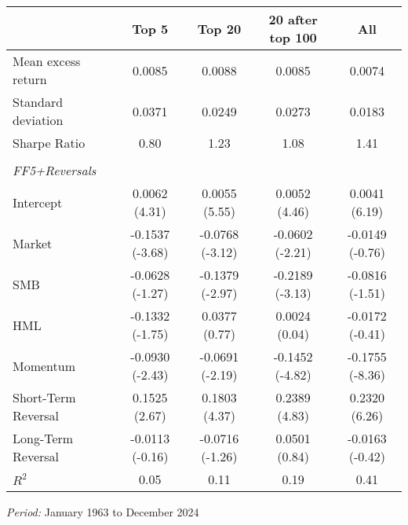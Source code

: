 \begin{table}[H]
\centering
\label{tab:systematic_risk}
\footnotesize
\begin{tabular}{lcccc}
\toprule
 & Top 5 & Top 20 & 20 after top 100 & All \\
\midrule
Mean excess return & 0.0085 & 0.0088 & 0.0085 & 0.0074 \\
Standard deviation & 0.0371 & 0.0249 & 0.0273 & 0.0183 \\
Sharpe Ratio & 0.80 & 1.23 & 1.08 & 1.41 \\
\\ \textit{FF5+Reversals} &&&& \\ \midrule
\rowcolor{yellow!20}
Intercept & 0.0062 (4.31) & 0.0055 (5.55) & 0.0052 (4.46) & 0.0041 (6.19) \\
Market & -0.1537 (-3.68) & -0.0768 (-3.12) & -0.0602 (-2.21) & -0.0149 (-0.76) \\
SMB & -0.0628 (-1.27) & -0.1379 (-2.97) & -0.2189 (-3.13) & -0.0816 (-1.51) \\
HML & -0.1332 (-1.75) & 0.0377 (0.77) & 0.0024 (0.04) & -0.0172 (-0.41) \\
\rowcolor{yellow!20}
Momentum & -0.0930 (-2.43) & -0.0691 (-2.19) & -0.1452 (-4.82) & -0.1755 (-8.36) \\
\rowcolor{yellow!20}
Short-Term Reversal & 0.1525 (2.67) & 0.1803 (4.37) & 0.2389 (4.83) & 0.2320 (6.26) \\
Long-Term Reversal & -0.0113 (-0.16) & -0.0716 (-1.26) & 0.0501 (0.84) & -0.0163 (-0.42) \\ \midrule
$R^2$ & 0.05 & 0.11 & 0.19 & 0.41 \\
\bottomrule
\end{tabular}

\medskip 
\textit{Period:} January 1963 to December 2024
\end{table}